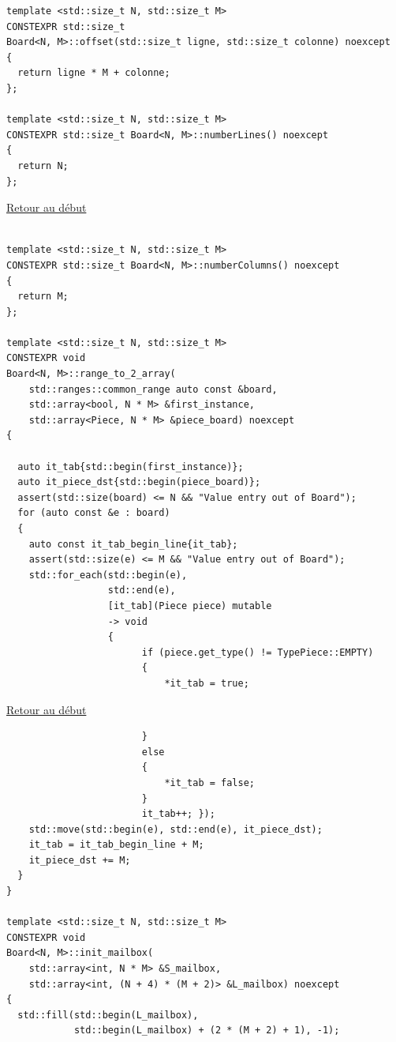 {\begin{frame}[fragile]
\begin{verbatim}
template <std::size_t N, std::size_t M>
CONSTEXPR std::size_t
Board<N, M>::offset(std::size_t ligne, std::size_t colonne) noexcept
{
  return ligne * M + colonne;
};

template <std::size_t N, std::size_t M>
CONSTEXPR std::size_t Board<N, M>::numberLines() noexcept
{
  return N;
};
\end{verbatim}
\end{frame}

\begin{frame}[fragile]
\hyperlink{conclusion}{Retour au début}\newline
\begin{verbatim}

template <std::size_t N, std::size_t M>
CONSTEXPR std::size_t Board<N, M>::numberColumns() noexcept
{
  return M;
};

template <std::size_t N, std::size_t M>
CONSTEXPR void
Board<N, M>::range_to_2_array(
    std::ranges::common_range auto const &board,
    std::array<bool, N * M> &first_instance,
    std::array<Piece, N * M> &piece_board) noexcept
{

  auto it_tab{std::begin(first_instance)};
  auto it_piece_dst{std::begin(piece_board)};
  assert(std::size(board) <= N && "Value entry out of Board");
  for (auto const &e : board)
  {
    auto const it_tab_begin_line{it_tab};
    assert(std::size(e) <= M && "Value entry out of Board");
    std::for_each(std::begin(e),
                  std::end(e),
                  [it_tab](Piece piece) mutable
                  -> void
                  {
                        if (piece.get_type() != TypePiece::EMPTY)
                        {
                            *it_tab = true;
\end{verbatim}
\end{frame}

\begin{frame}[fragile]
\hyperlink{conclusion}{Retour au début}\newline
\begin{verbatim}
                        }
                        else
                        {
                            *it_tab = false;
                        }
                        it_tab++; });
    std::move(std::begin(e), std::end(e), it_piece_dst);
    it_tab = it_tab_begin_line + M;
    it_piece_dst += M;
  }
}

template <std::size_t N, std::size_t M>
CONSTEXPR void
Board<N, M>::init_mailbox(
    std::array<int, N * M> &S_mailbox,
    std::array<int, (N + 4) * (M + 2)> &L_mailbox) noexcept
{
  std::fill(std::begin(L_mailbox),
            std::begin(L_mailbox) + (2 * (M + 2) + 1), -1);


\end{verbatim}
\end{frame}}
